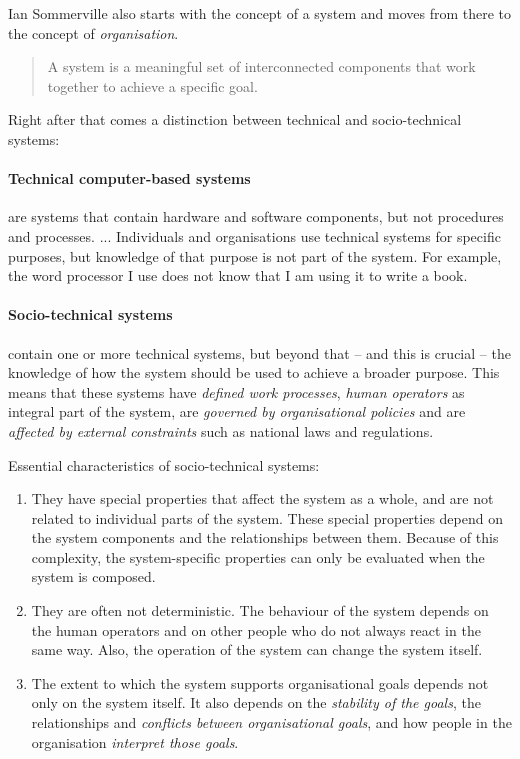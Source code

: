 \documentclass[11pt,a4paper]{article}
\begin{document}
Ian Sommerville \cite{Sommerville2015} also starts with the concept of a
system and moves from there to the concept of \emph{organisation}.
\begin{quote}
  A system is a meaningful set of interconnected components that work together
  to achieve a specific goal.  \cite{Sommerville2015}
\end{quote}
Right after that comes a distinction between technical and socio-technical
systems:

\paragraph{Technical computer-based systems}
are systems that contain hardware and software components, but not procedures
and processes. ... Individuals and organisations use technical systems for
specific purposes, but knowledge of that purpose is not part of the system.
For example, the word processor I use does not know that I am using it to
write a book.

\paragraph{Socio-technical systems}
contain one or more technical systems, but beyond that -- and this is crucial
-- the knowledge of how the system should be used to achieve a broader
purpose.  This means that these systems have \emph{defined work processes},
\emph{human operators} as integral part of the system, are \emph{governed by
  organisational policies} and are \emph{affected by external constraints}
such as national laws and regulations.

Essential characteristics of socio-technical systems:
\begin{enumerate}
\item They have special properties that affect the system as a whole, and are
  not related to individual parts of the system. These special properties
  depend on the system components and the relationships between them. Because
  of this complexity, the system-specific properties can only be evaluated
  when the system is composed.
\item They are often not deterministic. The behaviour of the system depends on
  the human operators and on other people who do not always react in the same
  way. Also, the operation of the system can change the system itself.
\item The extent to which the system supports organisational goals depends not
  only on the system itself. It also depends on the \emph{stability of the
    goals}, the relationships and \emph{conflicts between organisational
    goals}, and how people in the organisation \emph{interpret those goals}.
\end{enumerate}
\end{document}
